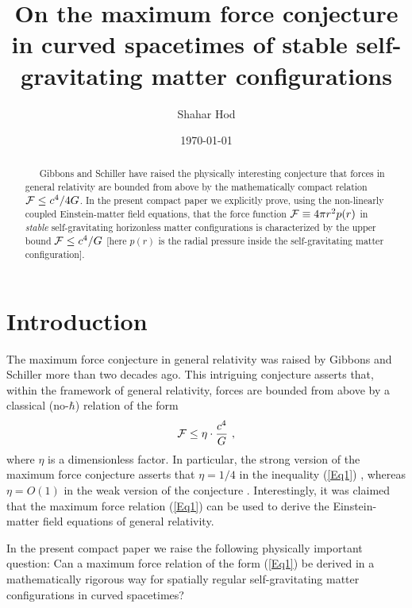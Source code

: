 \documentclass[preprintnumbers,amsmath,amssymbm,prd]{revtex4}
\begin{document}
\title{On the maximum force conjecture in curved spacetimes of stable self-gravitating matter configurations}
\author{Shahar Hod}
\affiliation{ } 
\date{\today}

\begin{abstract}

\ \ \ Gibbons and Schiller have raised the physically interesting conjecture that forces in general relativity 
are bounded from above by the mathematically compact relation ${\cal F}\leq c^4/4G$. 
In the present compact paper we explicitly prove, using the non-linearly coupled 
Einstein-matter field equations, that the force function ${\cal F}\equiv 4\pi r^2 p(r)$ in {\it stable} 
self-gravitating horizonless matter configurations is characterized by the 
upper bound ${\cal F}\leq c^4/G$ [here $p(r)$ is the 
radial pressure inside the self-gravitating matter configuration]. 
\end{abstract}
\bigskip
\maketitle

\section{Introduction}

The maximum force conjecture in general relativity was raised 
by Gibbons \cite{Gib} and Schiller \cite{Sch1,Sch2} more than two decades ago. 
This intriguing conjecture asserts that, within the framework of general relativity, forces 
are bounded from above by a classical (no-$\hbar$) relation of the form
\begin{equation}\label{Eq1}
{\cal F}\leq \eta\cdot{{c^4}\over{G}}\  ,
\end{equation}
where $\eta$ is a dimensionless factor. 
In particular, the strong version of the maximum force conjecture asserts that $\eta=1/4$ in 
the inequality (\ref{Eq1}) \cite{Gib,Sch1}, whereas $\eta=O(1)$ in 
the weak version of the conjecture \cite{Ong}. Interestingly, it was claimed \cite{Sch3} 
that the maximum force 
relation (\ref{Eq1}) can be used to derive the Einstein-matter field equations of general relativity. 

In the present compact paper we raise the following physically important 
question: Can a maximum force relation of the form (\ref{Eq1}) be derived in a mathematically rigorous way for 
spatially regular self-gravitating matter configurations in curved spacetimes?
\end{document}
